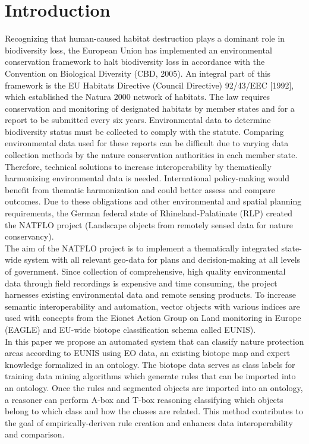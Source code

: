 \documentclass[authoryear, review,12pt,number]{elsarticle}
\begin{document}
\section{Introduction} 
Recognizing that human-caused habitat destruction plays a dominant role in
biodiversity loss, the European Union has implemented an environmental
conservation framework to halt biodiversity loss in accordance with the
Convention on Biological Diversity (CBD, 2005). An integral part of this
framework is the EU Habitats Directive (Council Directive) 92/43/EEC [1992],
which established the Natura 2000 network of habitats. The law requires
conservation and monitoring of designated habitats by member states and for a
report to be submitted every six years. Environmental data 
to determine biodiversity status must be collected to comply with the 
statute. Comparing environmental data used for these reports can be 
difficult due to varying data collection methods by the 
nature conservation authorities in each member state. Therefore, technical 
solutions to increase interoperability by thematically harmonizing 
environmental data is needed. International policy-making would benefit from 
thematic harmonization and could better assess and compare outcomes. Due to 
these obligations and other environmental and spatial planning requirements, 
the German federal state of
Rhineland-Palatinate (RLP) created the NATFLO project (Landscape objects from
remotely sensed data for nature conservancy).\\
The aim of the NATFLO project is to implement a
thematically integrated state-wide system with all relevant geo-data for plans
and decision-making at all levels of government.  Since collection of
comprehensive, high quality environmental data through field recordings is
expensive and time consuming, the project harnesses existing environmental data
and remote sensing products. To increase semantic interoperability and
automation, vector objects with various indices are used with concepts from the
Eionet Action Group on Land monitoring in Europe (EAGLE) and EU-wide 
biotope classification schema called EUNIS).\\
In this paper we propose an automated system that can classify nature protection
areas according to EUNIS using EO data, an existing biotope map
and expert knowledge formalized in an ontology. The biotope data serves as class
labels for training data mining algorithms which generate rules that can be
imported into an ontology. Once the rules and segmented objects are imported
into an ontology, a reasoner can perform A-box and T-box reasoning classifying
which objects belong to which class and how the classes are related. This method
contributes to the goal of empirically-deriven rule creation and enhances
data interoperability and comparison.
\end{document}
